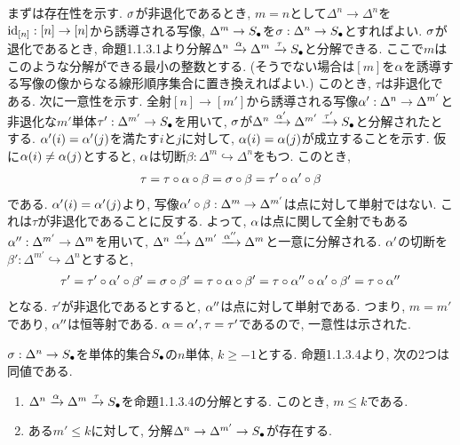 \documentclass[uplatex, a4paper, 14Q, dvipdfmx]{jsreport}
\begin{document}
\begin{Proof}
  まずは存在性を示す. 
  $\si$が非退化であるとき, $m=n$として$\Delta^n \to \Delta^n$を$\id_{[n]}: [n] \to [n]$から誘導される写像, $\Delta^m \to \S$を$\si: \Delta^n \to \S$とすればよい. 
  $\si$が退化であるとき, 命題1.1.3.1より分解$\Delta^n \xr{\al} \Delta^m \xr{\tau} \S$と分解できる. 
  ここで$m$はこのような分解ができる最小の整数とする. 
  (そうでない場合は$[m]$を$\al$を誘導する写像の像からなる線形順序集合に置き換えればよい.)
  このとき, $\tau$は非退化である.  
  次に一意性を示す. 
  全射$[n] \to [m']$から誘導される写像$\al': \Delta^n \to \Delta^{m'}$と非退化な$m'$単体$\tau': \Delta^{m'} \to \S$を用いて, $\si$が$\Delta^n \xr{\al'} \Delta^{m'} \xr{\tau'} \S$と分解されたとする. 
  $\al'(i)=\al'(j)$を満たす$i$と$j$に対して, $\al(i)=\al(j)$が成立することを示す. 
  仮に$\al(i) \neq \al(j)$とすると, $\al$は切断$\beta: \Delta^m \hookrightarrow \Delta^n$をもつ. 
  このとき, 
  \begin{align*}
    \tau 
    = \tau \ci \al \ci \beta
    = \si \ci \beta
    = \tau' \ci \al' \ci \beta
  \end{align*}
  である. 
  $\al'(i)=\al'(j)$より, 写像$\al' \ci \beta: \Delta^m \to \Delta^{m'}$は点に対して単射ではない. 
  これは$\tau$が非退化であることに反する. 
  よって, $\al$は点に関して全射でもある$\al'': \Delta^{m'} \to \Delta^m$を用いて, $\Delta^n \xr{\al'} \Delta^{m'} \xr{\al''} \Delta^m$と一意に分解される. 
  $\al'$の切断を$\beta': \Delta^{m'} \hookrightarrow \Delta^n$とすると, 
  \begin{align*}
    \tau'
    = \tau' \ci \al' \ci \beta'
    = \si \ci \beta'
    = \tau \ci \al \ci \beta'
    = \tau \ci \al'' \ci \al' \ci \beta'
    = \tau \ci \al''
  \end{align*}
  となる. 
  $\tau'$が非退化であるとすると, $\al''$は点に対して単射である. 
  つまり, $m=m'$であり, $\al''$は恒等射である. 
  $\al=\al', \tau=\tau'$であるので, 一意性は示された. 
\end{Proof}

\begin{cons}
  $\si: \Delta^n \to \S$を単体的集合$\S$の$n$単体, $k \geq -1$とする. 
  命題1.1.3.4より, 次の2つは同値である. 
  \begin{enumerate}
    \item $\Delta^n \xr{\al} \Delta^m \xr{\tau} \S$を命題1.1.3.4の分解とする. 
    このとき, $m \leq k$である. 
    \item ある$m' \leq k$に対して, 分解$\Delta^n \to \Delta^{m'} \to \S$が存在する. 
  \end{enumerate}
\end{cons}
\end{document}
